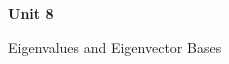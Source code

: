 \documentclass[12pt]{article}
\begin{document}
{\LARGE\bfseries Unit 8\par}
\vspace{3pt}
{\large Eigenvalues and Eigenvector Bases\par}

\end{document}
